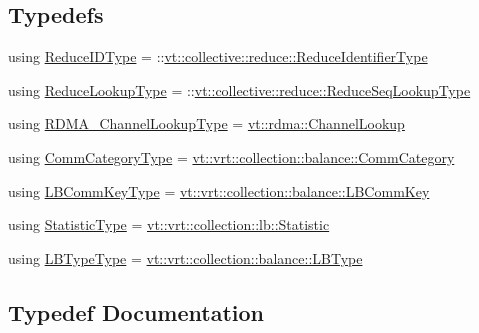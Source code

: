 \subsection*{Typedefs}
\begin{DoxyCompactItemize}
\item 
using \hyperlink{namespacestd_a499b9bfc09049e7ac355a623c6e3c357}{Reduce\+I\+D\+Type} = \+::\hyperlink{namespacevt_1_1collective_1_1reduce_ad688d164ad18b2011198cbc97cc84b74}{vt\+::collective\+::reduce\+::\+Reduce\+Identifier\+Type}
\item 
using \hyperlink{namespacestd_ac07dcbf55c02624fc69badeb378edb40}{Reduce\+Lookup\+Type} = \+::\hyperlink{namespacevt_1_1collective_1_1reduce_a3e69dddbbc89a0c9e9b986c5642efeba}{vt\+::collective\+::reduce\+::\+Reduce\+Seq\+Lookup\+Type}
\item 
using \hyperlink{namespacestd_a30c426bd959ae4c3814e36d01efe9df7}{R\+D\+M\+A\+\_\+\+Channel\+Lookup\+Type} = \hyperlink{structvt_1_1rdma_1_1_channel_lookup}{vt\+::rdma\+::\+Channel\+Lookup}
\item 
using \hyperlink{namespacestd_a4dd27d43e4725feae37124932561af56}{Comm\+Category\+Type} = \hyperlink{namespacevt_1_1vrt_1_1collection_1_1balance_a9cc6c6884ca0416dae824e9204093c57}{vt\+::vrt\+::collection\+::balance\+::\+Comm\+Category}
\item 
using \hyperlink{namespacestd_a3a6802ab62d3595b44a8463f8e654c31}{L\+B\+Comm\+Key\+Type} = \hyperlink{structvt_1_1vrt_1_1collection_1_1balance_1_1_l_b_comm_key}{vt\+::vrt\+::collection\+::balance\+::\+L\+B\+Comm\+Key}
\item 
using \hyperlink{namespacestd_a77b0310083adc8639f9659f5c8b3cf0d}{Statistic\+Type} = \hyperlink{namespacevt_1_1vrt_1_1collection_1_1lb_af0e20ef9afee77295053aa83bf1348b1}{vt\+::vrt\+::collection\+::lb\+::\+Statistic}
\item 
using \hyperlink{namespacestd_ae3c14c256fabd8bbed83c439b367c3d8}{L\+B\+Type\+Type} = \hyperlink{namespacevt_1_1vrt_1_1collection_1_1balance_ac4f99693509affcc67db182d4aad9b5c}{vt\+::vrt\+::collection\+::balance\+::\+L\+B\+Type}
\end{DoxyCompactItemize}


\subsection{Typedef Documentation}
\mbox{\label{namespacestd_a4dd27d43e4725feae37124932561af56}} 
